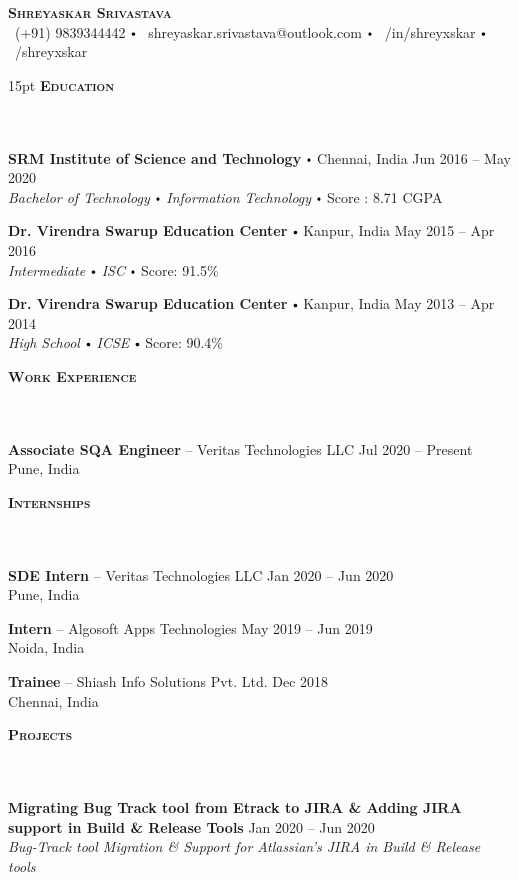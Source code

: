 \documentclass{article}
\newcommand{\contact}[3]{
\vspace*{5pt}
\begin{center}
{\LARGE \scshape {#1}}\\
\vspace{3pt}
#2 
\vspace{2pt}
#3
\end{center}
\vspace*{-8pt}
}
\newcommand{\header}[1]{{
\hspace*{-15pt}\vspace*{6pt} \textsc{#1}} \vspace*{-6pt} 
\lineunder
}
\newcommand{\lineunder}{
\vspace*{-8pt} \\ \hspace*{-18pt} 
\hrulefill \\
}
\newcommand{\school}[4]{
\textbf{#1} \labelitemi #2 \hfill #3 \\ #4 \vspace*{5pt}
}
\newcommand{\employer}[4]{{
\vspace*{2pt}%
\textbf{#1} #2 \hfill #3\\ #4 \vspace*{2pt}}
}
\newcommand{\project}[4]{{
\vspace*{2pt}%
\textbf{#1} #2 \hfill #3\\ \textit{#4} \vspace*{2pt}}
}
\renewcommand{\labelitemi}{
$\vcenter{\hbox{\tiny$\bullet$}}$\hspace*{3pt}
}
\renewcommand{\labelitemii}{
$\vcenter{\hbox{\tiny$\bullet$}}$\hspace*{-3pt}
}
\newenvironment{bullet-list-minor}{
\begin{list}{\labelitemii}{\setlength\leftmargin{15pt} 
\topsep 0pt \itemsep -2pt}}{\vspace*{4pt}\end{list}
}
\begin{document}
\small
\smallskip
\vspace*{-30pt}
\contact{\textbf{Shreyaskar Srivastava}}
{\faPhone\ (+91) 9839344442  \labelitemi \faEnvelope\ shreyaskar.srivastava@outlook.com  \labelitemi \faLinkedin\ /in/shreyxskar  \labelitemi \faGithub\ /shreyxskar}

\vspace{15pt}
\header{\textbf{Education}}
    \school{SRM Institute of Science and Technology}{Chennai, India}{Jun 2016 -- May 2020}
    {\textit{Bachelor of Technology \labelitemi Information Technology}\labelitemi Score : 8.71 CGPA}

    \school{Dr. Virendra Swarup Education Center}{Kanpur, India}{May 2015 -- Apr 2016}
    {\textit{Intermediate \labelitemi ISC}\labelitemi Score: 91.5\%}
    
    \school{Dr. Virendra Swarup Education Center}{Kanpur, India}{May 2013 -- Apr 2014}
    {\textit{High School \labelitemi ICSE}\labelitemi Score: 90.4\%}


\vspace*{6pt}%
\header{\textbf{Work Experience}}
    \employer{Associate SQA Engineer}{-- Veritas Technologies LLC}{Jul 2020 -- Present}{Pune, India}


\vspace*{6pt}%
\header{\textbf{Internships}}
    \employer{SDE Intern}{-- Veritas Technologies LLC}{Jan 2020 -- Jun 2020}{Pune, India}

    \employer{Intern}{-- Algosoft Apps Technologies}{May 2019 -- Jun 2019}{Noida, India}

    \employer{Trainee}{-- Shiash Info Solutions Pvt. Ltd.}{Dec 2018 }{Chennai, India}

\vspace*{6pt}%
\header{\textbf{Projects}}
    \project{Migrating Bug Track tool from Etrack to JIRA {\&} Adding\newline
    JIRA support in Build {\&} Release Tools}{ }{ Jan 2020 -- Jun 2020}{Bug-Track tool Migration {\&} Support for Atlassian's JIRA in Build {\&} Release tools}
\end{document}
